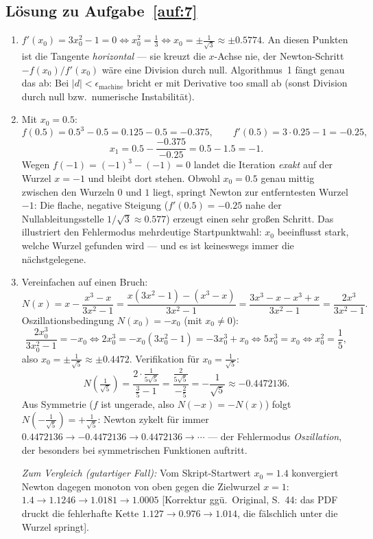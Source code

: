 \documentclass[a4paper,11pt]{scrartcl}
\begin{document}
\subsection*{Lösung zu Aufgabe~\ref{auf:7}}

\begin{enumerate}[label=(\alph*)]
  \item $f'(x_0) = 3x_0^2 - 1 = 0 \iff x_0^2 = \frac{1}{3} \iff
  x_0 = \pm\frac{1}{\sqrt{3}} \approx \pm 0.5774$.
  An diesen Punkten ist die Tangente \emph{horizontal} --- sie kreuzt die $x$-Achse nie,
  der Newton-Schritt $-f(x_0)/f'(x_0)$ wäre eine Division durch null. Algorithmus~1
  fängt genau das ab: Bei $|d| < \epsilon_{\text{machine}}$ bricht er mit
  \glqq Derivative too small\grqq{} ab (sonst Division durch null bzw.\ numerische
  Instabilität).
  \item Mit $x_0 = 0.5$:
  \[ f(0.5) = 0.5^3 - 0.5 = 0.125 - 0.5 = -0.375, \qquad
     f'(0.5) = 3 \cdot 0.25 - 1 = -0.25, \]
  \[ x_1 = 0.5 - \frac{-0.375}{-0.25} = 0.5 - 1.5 = -1. \]
  Wegen $f(-1) = (-1)^3 - (-1) = 0$ landet die Iteration \emph{exakt} auf der Wurzel
  $x = -1$ und bleibt dort stehen. Obwohl $x_0 = 0.5$ genau mittig zwischen den Wurzeln
  $0$ und $1$ liegt, springt Newton zur entferntesten Wurzel $-1$: Die flache, negative
  Steigung ($f'(0.5) = -0.25$ nahe der Nullableitungsstelle $1/\sqrt{3} \approx 0.577$)
  erzeugt einen sehr großen Schritt. Das illustriert den Fehlermodus
  \glqq mehrdeutige Startpunktwahl\grqq: $x_0$ beeinflusst stark, welche Wurzel gefunden
  wird --- und es ist keineswegs immer die nächstgelegene.
  \item Vereinfachen auf einen Bruch:
  \[ N(x) = x - \frac{x^3 - x}{3x^2 - 1}
          = \frac{x(3x^2 - 1) - (x^3 - x)}{3x^2 - 1}
          = \frac{3x^3 - x - x^3 + x}{3x^2 - 1}
          = \frac{2x^3}{3x^2 - 1}. \]
  Oszillationsbedingung $N(x_0) = -x_0$ (mit $x_0 \neq 0$):
  \[ \frac{2x_0^3}{3x_0^2 - 1} = -x_0
     \iff 2x_0^3 = -x_0(3x_0^2 - 1) = -3x_0^3 + x_0
     \iff 5x_0^3 = x_0
     \iff x_0^2 = \frac{1}{5}, \]
  also $x_0 = \pm\frac{1}{\sqrt{5}} \approx \pm 0.4472$.
  Verifikation für $x_0 = \frac{1}{\sqrt{5}}$:
  \[ N\!\left(\tfrac{1}{\sqrt{5}}\right)
     = \frac{2 \cdot \frac{1}{5\sqrt{5}}}{\frac{3}{5} - 1}
     = \frac{\frac{2}{5\sqrt{5}}}{-\frac{2}{5}}
     = -\frac{1}{\sqrt{5}} \approx -0.4472136. \]
  Aus Symmetrie ($f$ ist ungerade, also $N(-x) = -N(x)$) folgt
  $N(-\tfrac{1}{\sqrt{5}}) = +\tfrac{1}{\sqrt{5}}$: Newton zykelt für immer
  $0.4472136 \to -0.4472136 \to 0.4472136 \to \cdots$ --- der Fehlermodus
  \emph{Oszillation}, der besonders bei symmetrischen Funktionen auftritt.

  \emph{Zum Vergleich (gutartiger Fall):} Vom Skript-Startwert $x_0 = 1.4$ konvergiert
  Newton dagegen monoton von oben gegen die Zielwurzel $x = 1$:
  $1.4 \to 1.1246 \to 1.0181 \to 1.0005$ [Korrektur ggü.\ Original, S.~44: das PDF
  druckt die fehlerhafte Kette $1.127 \to 0.976 \to 1.014$, die fälschlich unter die
  Wurzel springt].
\end{enumerate}
\end{document}
